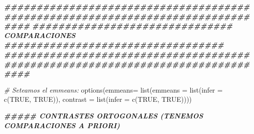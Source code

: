 \documentclass[
]{article}
\newenvironment{Shaded}{\begin{snugshade}}{\end{snugshade}}
\newcommand{\AttributeTok}[1]{\textcolor[rgb]{0.77,0.63,0.00}{#1}}
\newcommand{\CommentTok}[1]{\textcolor[rgb]{0.56,0.35,0.01}{\textit{#1}}}
\newcommand{\ConstantTok}[1]{\textcolor[rgb]{0.00,0.00,0.00}{#1}}
\newcommand{\DocumentationTok}[1]{\textcolor[rgb]{0.56,0.35,0.01}{\textbf{\textit{#1}}}}
\newcommand{\FunctionTok}[1]{\textcolor[rgb]{0.00,0.00,0.00}{#1}}
\newcommand{\NormalTok}[1]{#1}
\begin{document}
\begin{Shaded}
\begin{Highlighting}[]
\DocumentationTok{\#\#\#\#\#\#\#\#\#\#\#\#\#\#\#\#\#\#\#\#\#\#\#\#\#\#\#\#\#\#\#\#\#\#\#\#\#\#\#\#\#\#\#\#\#\#\#\#\#\#\#\#\#\#\#\#\#\#\#\#\#\#\#\#\#\#\#\#\#\#\#\#\#\#\#\#\#\#\#\#}
\DocumentationTok{\#\#\#\#\#\#\#\#\#\#\#\#\#\#\#\#\#\#\#\#\#\#\#\#\#\#\#\#\#\#\# COMPARACIONES \#\#\#\#\#\#\#\#\#\#\#\#\#\#\#\#\#\#\#\#\#\#\#\#\#\#\#\#\#\#\#\#\#\#}
\DocumentationTok{\#\#\#\#\#\#\#\#\#\#\#\#\#\#\#\#\#\#\#\#\#\#\#\#\#\#\#\#\#\#\#\#\#\#\#\#\#\#\#\#\#\#\#\#\#\#\#\#\#\#\#\#\#\#\#\#\#\#\#\#\#\#\#\#\#\#\#\#\#\#\#\#\#\#\#\#\#\#\#\#}

\CommentTok{\# Seteamos el emmeans:}
\FunctionTok{options}\NormalTok{(}\AttributeTok{emmeans=} \FunctionTok{list}\NormalTok{(}\AttributeTok{emmeans =} \FunctionTok{list}\NormalTok{(}\AttributeTok{infer =} \FunctionTok{c}\NormalTok{(}\ConstantTok{TRUE}\NormalTok{, }\ConstantTok{TRUE}\NormalTok{)),}
                      \AttributeTok{contrast =} \FunctionTok{list}\NormalTok{(}\AttributeTok{infer =} \FunctionTok{c}\NormalTok{(}\ConstantTok{TRUE}\NormalTok{, }\ConstantTok{TRUE}\NormalTok{))))}


\DocumentationTok{\#\#\#\#\# CONTRASTES ORTOGONALES (TENEMOS COMPARACIONES A PRIORI)}


\end{Highlighting}
\end{Shaded}
\end{document}
